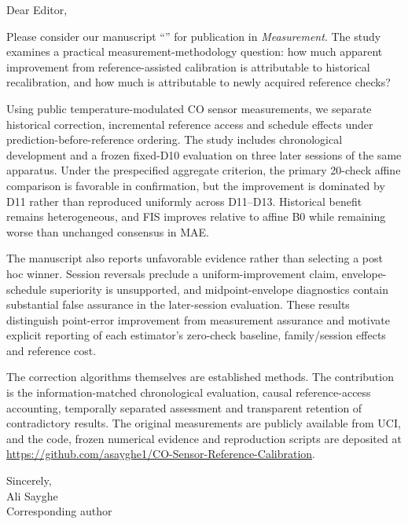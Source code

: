 \noindent Dear Editor,

\noindent Please consider our manuscript ``\ManuscriptTitle'' for publication in \emph{Measurement}. The study examines a practical measurement-methodology question: how much apparent improvement from reference-assisted calibration is attributable to historical recalibration, and how much is attributable to newly acquired reference checks?

Using public temperature-modulated CO sensor measurements, we separate historical correction, incremental reference access and schedule effects under prediction-before-reference ordering. The study includes chronological development and a frozen fixed-D10 evaluation on three later sessions of the same apparatus. Under the prespecified aggregate criterion, the primary 20-check affine comparison is favorable in confirmation, but the improvement is dominated by D11 rather than reproduced uniformly across D11--D13. Historical benefit remains heterogeneous, and FIS improves relative to affine B0 while remaining worse than unchanged consensus in MAE.

The manuscript also reports unfavorable evidence rather than selecting a post hoc winner. Session reversals preclude a uniform-improvement claim, envelope-schedule superiority is unsupported, and midpoint-envelope diagnostics contain substantial false assurance in the later-session evaluation. These results distinguish point-error improvement from measurement assurance and motivate explicit reporting of each estimator's zero-check baseline, family/session effects and reference cost.

The correction algorithms themselves are established methods. The contribution is the information-matched chronological evaluation, causal reference-access accounting, temporally separated assessment and transparent retention of contradictory results. The original measurements are publicly available from UCI, and the code, frozen numerical evidence and reproduction scripts are deposited at \url{https://github.com/asayghe1/CO-Sensor-Reference-Calibration}.

\bigskip
\noindent Sincerely,\\
Ali Sayghe\\
Corresponding author\\
\href{mailto:\CorrespondingEmail}{\CorrespondingEmail}
